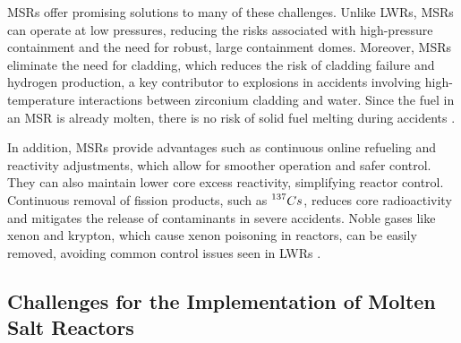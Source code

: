 MSRs offer promising solutions to many of these challenges. Unlike LWRs, MSRs can operate at low pressures, reducing the risks associated with high-pressure containment and the need for robust, large containment domes. Moreover, MSRs eliminate the need for cladding, which reduces the risk of cladding failure and hydrogen production, a key contributor to explosions in accidents involving high-temperature interactions between zirconium cladding and water. Since the fuel in an MSR is already molten, there is no risk of solid fuel melting during accidents \cite{TMSR_book}.

In addition, MSRs provide advantages such as continuous online refueling and reactivity adjustments, which allow for smoother operation and safer control. They can also maintain lower core excess reactivity, simplifying reactor control. Continuous removal of fission products, such as \(\prescript{137}{}{Cs}\), reduces core radioactivity and mitigates the release of contaminants in severe accidents. Noble gases like xenon and krypton, which cause xenon poisoning in reactors, can be easily removed, avoiding common control issues seen in LWRs \cite{TMSR_book}.

\subsection{Challenges for the Implementation of Molten Salt Reactors}


